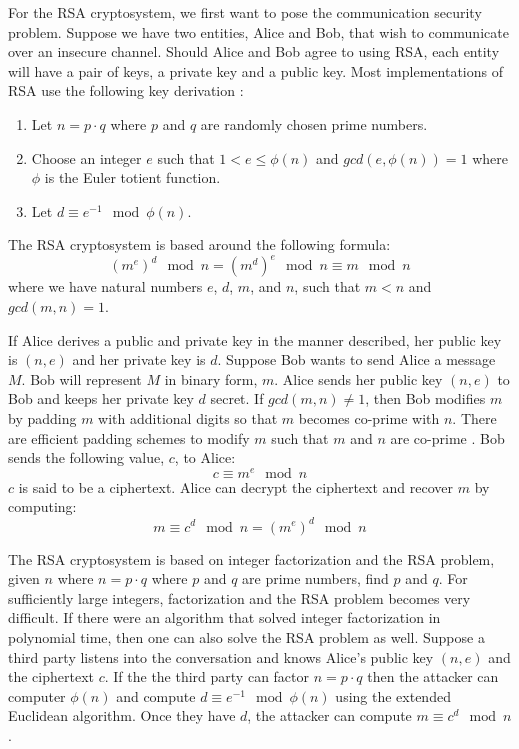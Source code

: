 \documentclass[10pt]{CSUNthesis}
\theoremstyle{plain}%
\theoremstyle{definition}
\theoremstyle{remark}
\newcommand{\lr}[1]{\left( #1 \right)}
\begin{document}
For the RSA cryptosystem, we first want to pose the communication security problem.  
Suppose we have two entities, Alice and Bob, that wish to communicate over an insecure channel.
Should Alice and Bob agree to using RSA, each entity will have a pair of keys, a private key and a public key.
Most implementations of RSA use the following key derivation \cite{rivest1978method}:
\begin{enumerate}
\item Let $n=p\cdot q$ where $p$ and $q$ are randomly chosen prime numbers.
\item Choose an integer $e$ such that $1 < e \leq \phi (n)$ and $gcd\lr{e,\phi\lr{n}}=1$ where $\phi$ is the Euler totient function.
\item Let $d \equiv e^{-1} \mod \phi(n)$.
\end{enumerate}
The RSA cryptosystem is based around the following formula:
$$\left(m^e\right)^d \mod n= \left(m^d\right)^e \mod n\equiv m \mod n$$
where we have natural numbers $e$, $d$, $m$, and $n$, such that $m < n$ and $gcd(m,n)=1$.


If Alice derives a public and private key in the manner described, her public key is $(n,e)$ and her private key is $d$.
Suppose Bob wants to send Alice a message $M$.  
Bob will represent $M$ in binary form, $m$.  
Alice sends her public key $(n,e)$ to Bob and keeps her private key $d$ secret.  
If $gcd(m,n)\neq 1$, then Bob modifies $m$ by padding $m$ with additional digits so that $m$ becomes co-prime with $n$.
There are efficient padding schemes to modify $m$ such that $m$ and $n$ are co-prime \cite{jonsson2003public}.
Bob sends the following value, $c$, to Alice:
$$c \equiv m^e \mod n$$
$c$ is said to be a ciphertext.
Alice can decrypt the ciphertext and recover $m$ by computing:
$$ m \equiv c^d \mod n = \lr{m^e}^d \mod n$$

The RSA cryptosystem is based on integer factorization and the RSA problem, given $n$ where $n=p\cdot q$ where $p$ and $q$ are prime numbers, find $p$ and $q$.
For sufficiently large integers, factorization and the RSA problem becomes very difficult.  
If there were an algorithm that solved integer factorization in polynomial time, then one can also solve the RSA problem as well.
Suppose a third party listens into the conversation and knows Alice's public key $(n,e)$ and the ciphertext $c$.
If the the third party can factor $n = p\cdot q$ then the attacker can computer $\phi(n)$ and compute $d \equiv e^{-1} \mod \phi(n)$ using the extended Euclidean algorithm.
Once they have $d$, the attacker can compute $m \equiv c^d \mod n$.
\end{document}
